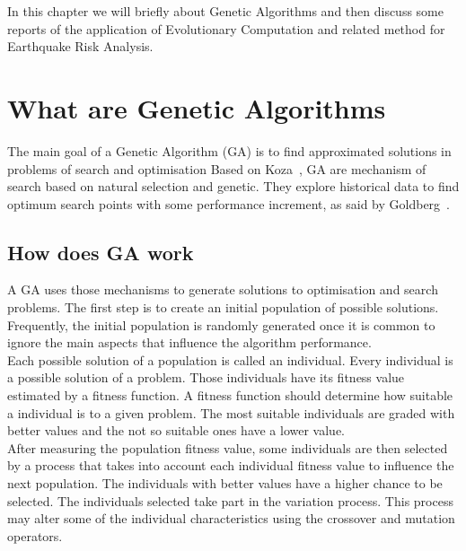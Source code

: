 In this chapter we will briefly about Genetic Algorithms and then discuss some reports of the application of Evolutionary Computation and related method for Earthquake Risk Analysis.\\

\section{What are Genetic Algorithms}
The main goal of a Genetic Algorithm (GA) is to find approximated solutions in problems of search and optimisation Based on Koza~\cite{koza2003genetic}, GA are mechanism of search based on natural selection and genetic. They explore historical data to find optimum search points with some performance increment, as said by Goldberg~\cite{Goldberg:1989:GASac:534133}.\\

\subsection{How does GA work}

A GA uses those mechanisms to generate solutions to optimisation and search problems. The first step is to create an initial population of possible solutions. Frequently, the initial population is randomly generated once it is common to ignore the main aspects that influence the algorithm performance.\\

Each possible solution of a population is called an individual. Every individual is a possible solution of a problem. Those individuals have its fitness value estimated by a fitness function. A fitness function should determine how suitable a individual is to a given problem. The most suitable individuals are graded with better values and the not so suitable ones have a lower value.\\

After measuring the population fitness value, some individuals are then selected by a process that takes into account each individual fitness value to influence the next population. The individuals with better values have a higher chance to be selected. The individuals selected take part in the variation process. This process may alter some of the individual characteristics using the crossover and mutation operators.\\

